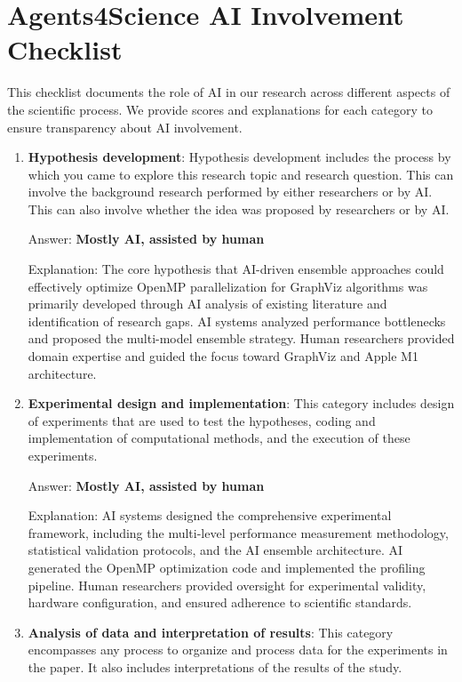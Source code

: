 \section*{Agents4Science AI Involvement Checklist}

This checklist documents the role of AI in our research across different aspects of the scientific process. We provide scores and explanations for each category to ensure transparency about AI involvement.

\begin{enumerate}
    \item \textbf{Hypothesis development}: Hypothesis development includes the process by which you came to explore this research topic and research question. This can involve the background research performed by either researchers or by AI. This can also involve whether the idea was proposed by researchers or by AI. 

    Answer: \textbf{Mostly AI, assisted by human}
    
    Explanation: The core hypothesis that AI-driven ensemble approaches could effectively optimize OpenMP parallelization for GraphViz algorithms was primarily developed through AI analysis of existing literature and identification of research gaps. AI systems analyzed performance bottlenecks and proposed the multi-model ensemble strategy. Human researchers provided domain expertise and guided the focus toward GraphViz and Apple M1 architecture.
    
    \item \textbf{Experimental design and implementation}: This category includes design of experiments that are used to test the hypotheses, coding and implementation of computational methods, and the execution of these experiments. 

    Answer: \textbf{Mostly AI, assisted by human}
    
    Explanation: AI systems designed the comprehensive experimental framework, including the multi-level performance measurement methodology, statistical validation protocols, and the AI ensemble architecture. AI generated the OpenMP optimization code and implemented the profiling pipeline. Human researchers provided oversight for experimental validity, hardware configuration, and ensured adherence to scientific standards.
    
    \item \textbf{Analysis of data and interpretation of results}: This category encompasses any process to organize and process data for the experiments in the paper. It also includes interpretations of the results of the study.
 

\end{enumerate}
